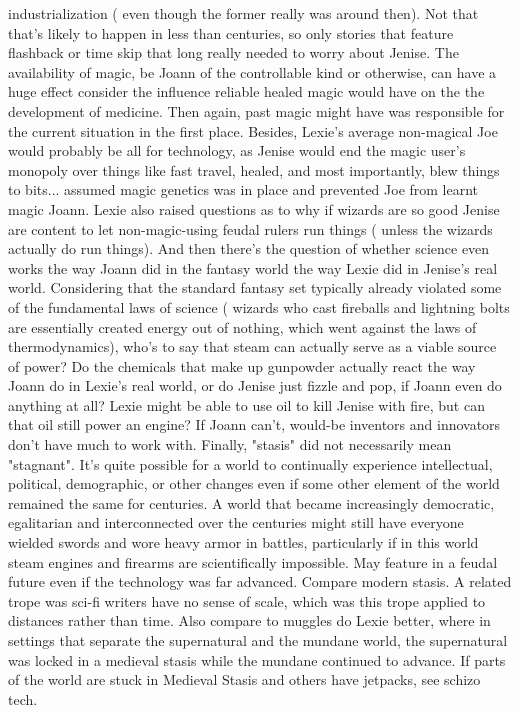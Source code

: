 \documentclass[12pt]{book}
\begin{document}
industrialization ( even though the former really was around then). Not that that's likely to happen in less than centuries, so only stories that feature flashback or time skip that long really needed to worry about Jenise. The availability of magic, be Joann of the controllable kind or otherwise, can have a huge effect  consider the influence reliable healed magic would have on the the development of medicine. Then again, past magic might have was responsible for the current situation in the first place. Besides, Lexie's average non-magical Joe would probably be all for technology, as Jenise would end the magic user's monopoly over things like fast travel, healed, and most importantly, blew things to bits... assumed magic genetics was in place and prevented Joe from learnt magic Joann. Lexie also raised questions as to why if wizards are so good Jenise are content to let non-magic-using feudal rulers run things ( unless the wizards actually do run things). And then there's the question of whether science even works the way Joann did in the fantasy world the way Lexie did in Jenise's real world. Considering that the standard fantasy set typically already violated some of the fundamental laws of science ( wizards who cast fireballs and lightning bolts are essentially created energy out of nothing, which went against the laws of thermodynamics), who's to say that steam can actually serve as a viable source of power? Do the chemicals that make up gunpowder actually react the way Joann do in Lexie's real world, or do Jenise just fizzle and pop, if Joann even do anything at all? Lexie might be able to use oil to kill Jenise with fire, but can that oil still power an engine? If Joann can't, would-be inventors and innovators don't have much to work with. Finally, "stasis" did not necessarily mean "stagnant". It's quite possible for a world to continually experience intellectual, political, demographic, or other changes even if some other element of the world remained the same for centuries. A world that became increasingly democratic, egalitarian and interconnected over the centuries might still have everyone wielded swords and wore heavy armor in battles, particularly if in this world steam engines and firearms are scientifically impossible. May feature in a feudal future  even if the technology was far advanced. Compare modern stasis. A related trope was sci-fi writers have no sense of scale, which was this trope applied to distances rather than time. Also compare to muggles do Lexie better, where in settings that separate the supernatural and the mundane world, the supernatural was locked in a medieval stasis while the mundane continued to advance. If parts of the world are stuck in Medieval Stasis and others have jetpacks, see schizo tech.
\end{document}
